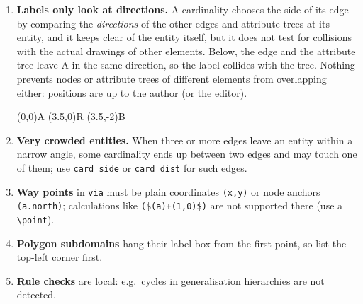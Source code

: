 \documentclass[10pt,a4paper]{article}
\newcommand\cs[1]{\texttt{\textbackslash#1}}
\begin{document}
\begin{enumerate}
\item \textbf{Labels only look at directions.} A cardinality chooses the
  side of its edge by comparing the \emph{directions} of the other edges
  and attribute trees at its entity, and it keeps clear of the entity
  itself, but it does not test for collisions with the actual drawings
  of other elements. Below, the edge and the attribute tree leave A in
  the same direction, so the label collides with the tree. Nothing
  prevents nodes or attribute trees of different elements from
  overlapping either: positions are up to the author (or the editor).
\begin{example}
\begin{erdiagram}
  (0,0){A}
  (3.5,0){R}
  (3.5,-2){B}
\end{erdiagram}
\end{example}
\item \textbf{Very crowded entities.} When three or more edges leave an
  entity within a narrow angle, some cardinality ends up between two
  edges and may touch one of them; use \texttt{card side} or
  \texttt{card dist} for such edges.
\item \textbf{Way points} in \texttt{via} must be plain coordinates
  \verb|(x,y)| or node anchors \verb|(a.north)|; calculations like
  \verb|($(a)+(1,0)$)| are not supported there (use a \cs{point}).
\item \textbf{Polygon subdomains} hang their label box from the first
  point, so list the top-left corner first.
\item \textbf{Rule checks} are local: e.g.\ cycles in generalisation
  hierarchies are not detected.
\end{enumerate}
\end{document}
